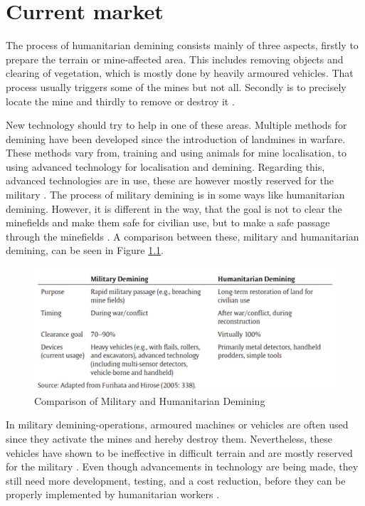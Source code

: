 \chapter{Current market}

The process of humanitarian demining consists mainly of three aspects, firstly to prepare the terrain or mine-affected area. This includes removing objects and clearing of vegetation, which is mostly done by heavily armoured vehicles. That process usually triggers some of the mines but not all. Secondly is to precisely locate the mine and thirdly to remove or destroy it \cite{HiddenKillers2019}.

New technology should try to help in one of these areas. Multiple methods for demining have been developed since the introduction of landmines in warfare. These methods vary from, training and using animals for mine localisation, to using advanced technology for localisation and demining. Regarding this, advanced technologies are in use, these are however mostly reserved for the military \cite{HiddenKillers2019}.
The process of military demining is in some ways like humanitarian demining. However, it is different in the way, that the goal is not to clear the minefields and make them safe for civilian use, but to make a safe passage through the minefields \cite{HiddenKillers2019}. A comparison between these, military and humanitarian demining, can be seen in Figure \ref{fig:military_humanitarian_demining}.

\medskip

\begin{figure}[h]
  \centering
      \includegraphics[width=1\textwidth]{00 - Images/military_humanitarian_demining.png}
  \caption{Comparison of Military and Humanitarian Demining \cite{HiddenKillers2019}}
  \label{fig:military_humanitarian_demining}
\end{figure}

In military demining-operations, armoured machines or vehicles are often used since they activate the mines and hereby destroy them. Nevertheless, these vehicles have shown to be ineffective in difficult terrain and are mostly reserved for the military \cite{6LeggedRobot2007}. Even though advancements in technology are being made, they still need more development, testing, and a cost reduction, before they can be properly implemented by humanitarian workers \cite{HiddenKillers2019}. 

